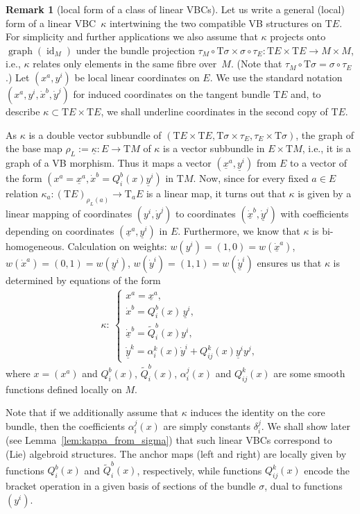 \documentclass[pdftex]{sigma}
\newcommand{\ZM}{{VBC}} %
\newcommand{\wt}[1]{\widetilde{#1}} %
\newcommand{\und}{\underline}
\newcommand{\graf}{\operatorname{graph}}
\newcommand{\id}{\operatorname{id}}
\newcommand{\ra}{\rightarrow}
\newcommand{\rhoL}{\rho_L} %
\newcommand{\T}{\mathrm{T}} %
\numberwithin{equation}{section}
\theoremstyle{definition}
\newtheorem{rem}[thm]{Remark}
\begin{document}
\begin{rem}[local form of a class of linear \ZM s]\label{rem:local_kappa_a}
Let us write a general (local) form of a linear \ZM\ $\kappa$ intertwining the two compatible VB structures on $\T E$. For simplicity and further applications we also assume that $\kappa$ projects onto $\graf(\id_M)$ under the bundle projection $\tau_M\circ \T\sigma \times \sigma \circ \tau_E\colon \T E\times \T E\ra M\times M$, i.e., $\kappa$ relates only elements in the same fibre over~$M$. (Note that $\tau_M\circ \T\sigma = \sigma \circ \tau_E$.) Let $(x^a, y^i)$ be local linear coordinates on $E$. We use the standard notation $(x^a, y^i,\dot x^b, \dot y^j)$ for induced coordinates on the tangent bundle $\T E$ and, to describe $\kappa \subset \T E\times \T E$, we shall underline coordinates in the second copy of $\T E$.

 As $\kappa$ is a double vector subbundle of $(\T E\times \T E, \T\sigma \times \tau_E, \tau_E\times \T \sigma)$, the graph of the base map $\rhoL:=\und{\kappa}\colon E\ra \T M$ of $\kappa$ is a vector subbundle in $E\times \T M$, i.e., it is a graph of a VB morphism. Thus it maps a vector $(\und{x}^a,\und{y}^i)$ from $E$ to a vector of the form $(x^a=\und{x}^a, \dot x^b=Q^b_i(x)\und{y}^i)$ in $\T M$. Now, since for every fixed $a\in E$ relation $\kappa_a\colon (\T E)_{\rhoL(a)}\ra \T_a E$ is a linear map, it turns out that $\kappa$ is given by a linear mapping of coordinates $(y^i,\dot{y}^j)$ to coordinates $(\und{\dot x}^b,\und{\dot y}^j)$ with coefficients depending on coordinates $(\und{x}^a,\und{y}^i)$ in $E$. Furthermore, we know that $\kappa$ is bi-homogeneous. Calculation on weights: $w(y^i)=(1,0)=w(\dot{\und{x}}^a)$, $w(\dot{x}^a)=(0,1)=w(\und{y}^i)$, $w(\dot{y}^i)=(1,1)=w(\dot{\und{y}}^i)$ ensures us that $\kappa$ is determined by equations of the form
\begin{gather}\label{eqn:kappa_local}
\kappa\colon \
\begin{cases}
x^a=\und{x}^a, \\
\dot{x}^b = Q^b_i(x)\, \und{y}^i, \\
 \dot{\und{x}}^b = \wt{Q}^b_i(x) y^i, \\
 \dot{\und{y}}^k = \alpha^k_i(x) \dot{y}^i + Q^k_{ij}(x) \und{y}^iy^j,
	\end{cases}
\end{gather}
where $x = (x^a)$ and $Q^b_i(x)$, $\wt{Q}^b_i(x)$, $\alpha^j_i(x)$ and $Q^k_{ij}(x)$ are some smooth functions defined locally on $M$.

 Note that if we additionally assume that $\kappa$ induces the identity on the core bundle, then the coefficients $\alpha^j_i(x)$ are simply constants $\delta^j_i$. We shall show later (see Lemma~\ref{lem:kappa_from_sigma}) that such linear \ZM s correspond to (Lie) algebroid structures. The anchor maps (left and right) are locally given by functions $Q^b_i(x)$ and $\wt{Q}^b_i(x)$, respectively, while functions $Q^k_{ij}(x)$ encode the bracket operation in a given basis of sections of the bundle $\sigma$, dual to functions $(y^i)$.
\end{rem}
\end{document}
